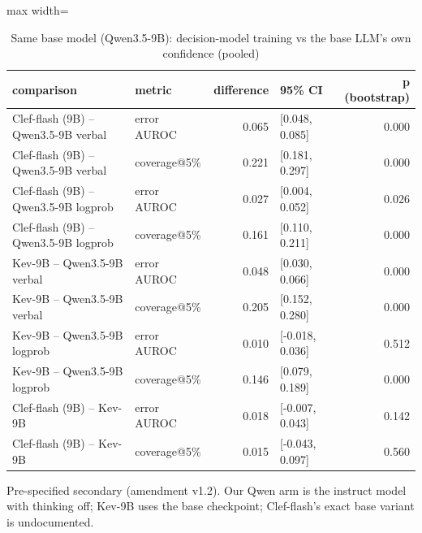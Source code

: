 \begin{table}[t]
\centering
\small
\caption{Same base model (Qwen3.5-9B): decision-model training vs the base LLM's own confidence (pooled)}
\label{tab:tab14_same_base}
\begin{adjustbox}{max width=\linewidth}
\begin{tabular}{llrlr}
\toprule
comparison & metric & difference & 95\% CI & p (bootstrap) \\
\midrule
Clef-flash (9B) -- Qwen3.5-9B verbal & error AUROC & 0.065 & [0.048, 0.085] & 0.000 \\
Clef-flash (9B) -- Qwen3.5-9B verbal & coverage@5\% & 0.221 & [0.181, 0.297] & 0.000 \\
Clef-flash (9B) -- Qwen3.5-9B logprob & error AUROC & 0.027 & [0.004, 0.052] & 0.026 \\
Clef-flash (9B) -- Qwen3.5-9B logprob & coverage@5\% & 0.161 & [0.110, 0.211] & 0.000 \\
Kev-9B -- Qwen3.5-9B verbal & error AUROC & 0.048 & [0.030, 0.066] & 0.000 \\
Kev-9B -- Qwen3.5-9B verbal & coverage@5\% & 0.205 & [0.152, 0.280] & 0.000 \\
Kev-9B -- Qwen3.5-9B logprob & error AUROC & 0.010 & [-0.018, 0.036] & 0.512 \\
Kev-9B -- Qwen3.5-9B logprob & coverage@5\% & 0.146 & [0.079, 0.189] & 0.000 \\
Clef-flash (9B) -- Kev-9B & error AUROC & 0.018 & [-0.007, 0.043] & 0.142 \\
Clef-flash (9B) -- Kev-9B & coverage@5\% & 0.015 & [-0.043, 0.097] & 0.560 \\
\bottomrule
\end{tabular}
\end{adjustbox}
\par\smallskip\footnotesize\raggedright Pre-specified secondary (amendment v1.2). Our Qwen arm is the instruct model with thinking off; Kev-9B uses the base checkpoint; Clef-flash's exact base variant is undocumented.
\end{table}
